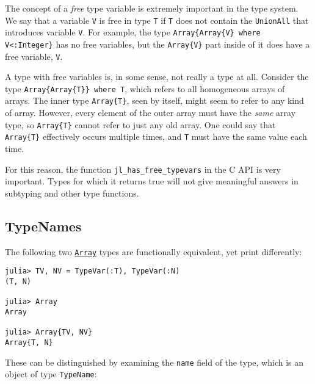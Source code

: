 The concept of a \emph{free} type variable is extremely important in the type system. We say that a variable \texttt{V} is free in type \texttt{T} if \texttt{T} does not contain the \texttt{UnionAll} that introduces variable \texttt{V}. For example, the type \texttt{Array\{Array\{V\} where V<:Integer\}} has no free variables, but the \texttt{Array\{V\}} part inside of it does have a free variable, \texttt{V}.



A type with free variables is, in some sense, not really a type at all. Consider the type \texttt{Array\{Array\{T\}\} where T}, which refers to all homogeneous arrays of arrays. The inner type \texttt{Array\{T\}}, seen by itself, might seem to refer to any kind of array. However, every element of the outer array must have the \emph{same} array type, so \texttt{Array\{T\}} cannot refer to just any old array. One could say that \texttt{Array\{T\}} effectively {\textquotedbl}occurs{\textquotedbl} multiple times, and \texttt{T} must have the same value each {\textquotedbl}time{\textquotedbl}.



For this reason, the function \texttt{jl\_has\_free\_typevars} in the C API is very important. Types for which it returns true will not give meaningful answers in subtyping and other type functions.



\hypertarget{9475610527503799038}{}


\subsection{TypeNames}



The following two \hyperlink{15492651498431872487}{\texttt{Array}} types are functionally equivalent, yet print differently:




\begin{verbatim}
julia> TV, NV = TypeVar(:T), TypeVar(:N)
(T, N)

julia> Array
Array

julia> Array{TV, NV}
Array{T, N}
\end{verbatim}



These can be distinguished by examining the \texttt{name} field of the type, which is an object of type \texttt{TypeName}:





